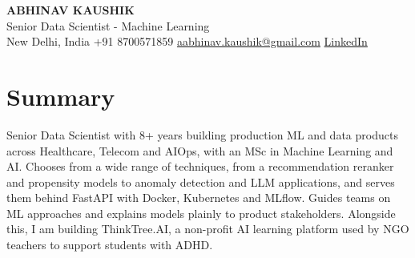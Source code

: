 \documentclass[10pt,a4paper]{article}
\begin{document}
\begin{center}
  {\LARGE\bfseries ABHINAV KAUSHIK}\\[2pt]
  {\large Senior Data Scientist - Machine Learning}\\[2pt]
  New Delhi, India \textbar{} +91 8700571859 \textbar{} \href{mailto:aabhinav.kaushik@gmail.com}{aabhinav.kaushik@gmail.com} \textbar{} \href{https://www.linkedin.com/in/abhinav-kaushik10/}{LinkedIn}  
\end{center}

\section{Summary}
Senior Data Scientist with 8+ years building production ML and data products across Healthcare, Telecom and AIOps, with an MSc in Machine Learning and AI. Chooses from a wide range of techniques, from a recommendation reranker and propensity models to anomaly detection and LLM applications, and serves them behind FastAPI with Docker, Kubernetes and MLflow. Guides teams on ML approaches and explains models plainly to product stakeholders. Alongside this, I am building ThinkTree.AI, a non-profit AI learning platform used by NGO teachers to support students with ADHD.
\end{document}
